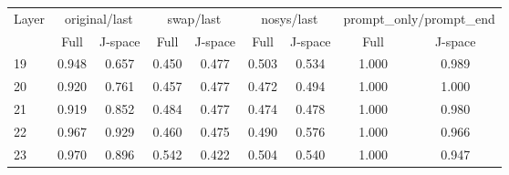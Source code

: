 \begin{tabular}{lcccccccc}\toprule
Layer & \multicolumn{2}{c}{original/last} & \multicolumn{2}{c}{swap/last} & \multicolumn{2}{c}{nosys/last} & \multicolumn{2}{c}{prompt\_only/prompt\_end}\\
 & Full & J-space & Full & J-space & Full & J-space & Full & J-space\\\midrule
19 & 0.948 & 0.657 & 0.450 & 0.477 & 0.503 & 0.534 & 1.000 & 0.989\\
20 & 0.920 & 0.761 & 0.457 & 0.477 & 0.472 & 0.494 & 1.000 & 1.000\\
21 & 0.919 & 0.852 & 0.484 & 0.477 & 0.474 & 0.478 & 1.000 & 0.980\\
22 & 0.967 & 0.929 & 0.460 & 0.475 & 0.490 & 0.576 & 1.000 & 0.966\\
23 & 0.970 & 0.896 & 0.542 & 0.422 & 0.504 & 0.540 & 1.000 & 0.947\\
\bottomrule\end{tabular}

